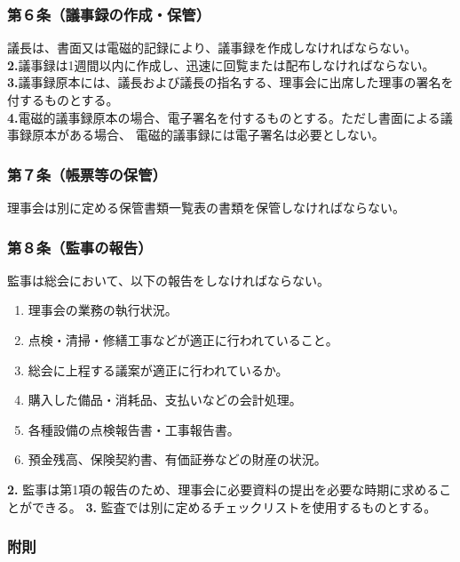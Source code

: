\documentclass[
  luatex,
  paper=a4paper,
  fontsize=11pt,
  jafontsize=11pt,
  jlreq_notes,
]{jlreq}
\begin{document}
  \subsubsection*{ 第６条（議事録の作成・保管）}
  議長は、書面又は電磁的記録により、議事録を作成しなければならない。\\
  \textbf{2.}議事録は1週間以内に作成し、迅速に回覧または配布しなければならない。\\
  \textbf{3.}議事録原本には、議長および議長の指名する、理事会に出席した理事の署名を付するものとする。\\
  \textbf{4.}電磁的議事録原本の場合、電子署名を付するものとする。ただし書面による議事録原本がある場合、
  電磁的議事録には電子署名は必要としない。
  \subsubsection*{ 第７条（帳票等の保管）}
  理事会は別に定める保管書類一覧表の書類を保管しなければならない。\\
  \subsubsection*{ 第８条（監事の報告）}
  監事は総会において、以下の報告をしなければならない。
  \begin{enumerate}
    \item 理事会の業務の執行状況。
    \item 点検・清掃・修繕工事などが適正に行われていること。
    \item 総会に上程する議案が適正に行われているか。
    \item 購入した備品・消耗品、支払いなどの会計処理。
    \item 各種設備の点検報告書・工事報告書。
    \item 預金残高、保険契約書、有価証券などの財産の状況。
  \end{enumerate}
  \textbf{2.} 監事は第1項の報告のため、理事会に必要資料の提出を必要な時期に求めることができる。
  \textbf{3.} 監査では別に定めるチェックリストを使用するものとする。
  
  \begin{center}
  \subsubsection*{附則}
  \end{center}
\end{document}
